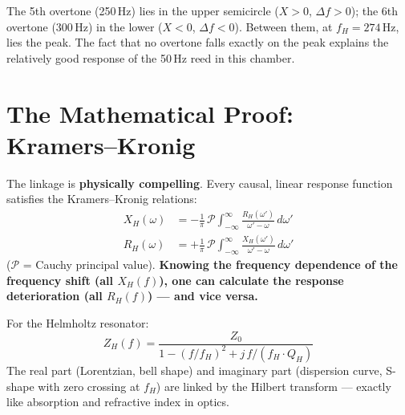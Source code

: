 \documentclass[11pt,a4paper]{article}
\begin{document}
\begin{table}[H]
\centering\small
{}
\caption{Nyquist positions of the overtones. At the peak ($f_H$): max.\ damping, $X_H$ changes sign.}
\end{table}

The 5th overtone (250\,Hz) lies in the upper semicircle ($X > 0$, $\Delta f > 0$); the 6th overtone (300\,Hz) in the lower ($X < 0$, $\Delta f < 0$). Between them, at $f_H = 274$\,Hz, lies the peak. The fact that no overtone falls exactly on the peak explains the relatively good response of the 50\,Hz reed in this chamber.

\section{The Mathematical Proof: Kramers--Kronig}

The linkage is \textbf{physically compelling}. Every causal, linear response function satisfies the Kramers--Kronig relations:
\begin{align}
X_H(\omega) &= -\frac{1}{\pi}\, \mathcal{P} \int_{-\infty}^{\infty} \frac{R_H(\omega')}{\omega' - \omega}\, d\omega' \\
R_H(\omega) &= +\frac{1}{\pi}\, \mathcal{P} \int_{-\infty}^{\infty} \frac{X_H(\omega')}{\omega' - \omega}\, d\omega'
\end{align}
($\mathcal{P}$ = Cauchy principal value). \textbf{Knowing the frequency dependence of the frequency shift (all $X_H(f)$), one can calculate the response deterioration (all $R_H(f)$) --- and vice versa.}

For the Helmholtz resonator:
\begin{equation}
Z_H(f) = \frac{Z_0}{1 - (f/f_H)^2 + j\,f/(f_H \cdot Q_H)}
\end{equation}
The real part (Lorentzian, bell shape) and imaginary part (dispersion curve, S-shape with zero crossing at $f_H$) are linked by the Hilbert transform --- exactly like absorption and refractive index in optics.
\end{document}
